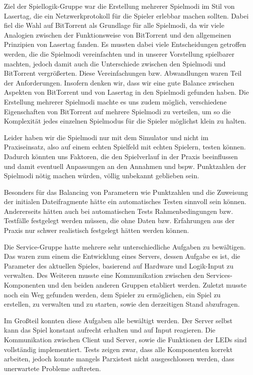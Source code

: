 Ziel der Spiellogik-Gruppe war die Erstellung mehrerer Spielmodi im Stil von 
Lasertag, die ein Netzwerkprotokoll für die Spieler erlebbar machen sollten. 
Dabei fiel die Wahl auf BitTorrent als Grundlage für alle Spielmodi, da wir viele 
Analogien zwischen der Funktionsweise von BitTorrent und den allgemeinen
Prinzipien von Lasertag fanden. Es mussten dabei viele Entscheidungen getroffen 
werden, die die Spielmodi vereinfachten und in unserer Vorstellung spielbarer
machten, jedoch damit auch die Unterschiede zwischen den Spielmodi und BitTorrent
vergrößerten. Diese Vereinfachungen bzw. Abwandlungen waren Teil der
Anforderungen. Insofern denken wir, dass wir eine gute Balance zwischen Aspekten 
von BitTorrent und von Lasertag in den Spielmodi gefunden haben. Die Erstellung
mehrerer Spielmodi machte es uns zudem möglich, verschiedene Eigenschaften von 
BitTorrent auf mehrere Spielmodi zu verteilen, um so die Komplexität jedes
einzelnen Spielmodus für die Spieler möglichst klein zu halten.

Leider haben wir die Spielmodi nur mit dem Simulator und nicht im Praxiseinsatz, 
also auf einem echten Spielfeld mit echten Spielern, testen können. Dadurch 
könnten uns Faktoren, die den Spielverlauf in der Praxis beeinflussen und damit
eventuell Anpassungen an den Annahmen und bspw. Punktzahlen der Spielmodi nötig 
machen würden, völlig unbekannt geblieben sein.

Besonders für das Balancing von Parametern wie Punktzahlen und die Zuweisung der
initialen Dateifragmente hätte ein automatisches Testen sinnvoll sein können.
Andererseits hätten auch bei automatischen Tests Rahmenbedingungen bzw. Testfälle 
festgelegt werden müssen, die ohne Daten bzw. Erfahrungen aus der Praxis nur schwer 
realistisch festgelegt hätten werden können.
\newline

Die Service-Gruppe hatte mehrere sehr unterschiedliche Aufgaben zu bewältigen. 
Das waren zum einem die Entwicklung eines Servers, dessen Aufgabe es ist, die Parameter des aktuellen Spieles, 
basierend auf Hardware und Logik-Input zu verwalten. Des Weiteren musste eine Kommunikation zwischen den 
Services-Komponenten und den beiden anderen Gruppen etabliert werden. Zuletzt musste noch ein Weg gefunden werden, 
dem Spieler zu ermöglichen, ein Spiel zu erstellen, zu verwalten und zu starten, sowie den derzeitigen Stand abzufragen.

Im Großteil konnten diese Aufgaben alle bewältigt werden. Der Server selbst kann das Spiel konstant aufrecht erhalten 
und auf Input reagieren. Die Kommunikation zwischen Client und Server, sowie die Funktionen der LEDs sind vollständig implementiert. 
Tests zeigen zwar, dass alle Komponenten korrekt arbeiten, jedoch konnte mangels Parxistest nicht ausgeschlossen werden, dass unerwartete Probleme auftreten.

